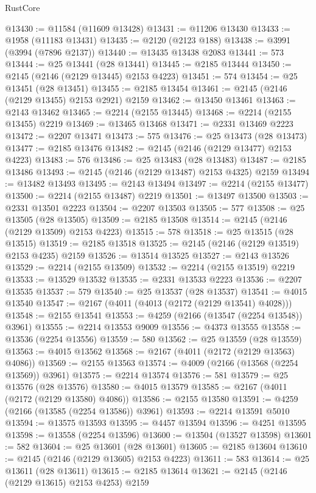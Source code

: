 \begin{lexlean}{RustCore}
\begin{coremodule}
@13430 := @11584 (@11609 @13428)
@13431 := @11206 @13430
@13433 := @1958 (@11183 @13431)
@13435 := @2120 (@2123 @188)
@13438 := @3991 (@3994 (@7896 @2137))
@13440 := @13435 @13438 @2083
@13441 := 573
@13444 := @25 @13441 (@28 @13441)
@13445 := @2185 @13444
@13450 := @2145 (@2146 (@2129 @13445) @2153 @4223)
@13451 := 574
@13454 := @25 @13451 (@28 @13451)
@13455 := @2185 @13454
@13461 := @2145 (@2146 (@2129 @13455) @2153 @2921) @2159
@13462 := @13450 @13461
@13463 := @2143 @13462
@13465 := @2214 (@2155 @13445)
@13468 := @2214 (@2155 @13455) @2219
@13469 := @13465 @13468
@13471 := @2331 @13469 @2223
@13472 := @2207 @13471
@13473 := 575
@13476 := @25 @13473 (@28 @13473)
@13477 := @2185 @13476
@13482 := @2145 (@2146 (@2129 @13477) @2153 @4223)
@13483 := 576
@13486 := @25 @13483 (@28 @13483)
@13487 := @2185 @13486
@13493 := @2145 (@2146 (@2129 @13487) @2153 @4325) @2159
@13494 := @13482 @13493
@13495 := @2143 @13494
@13497 := @2214 (@2155 @13477)
@13500 := @2214 (@2155 @13487) @2219
@13501 := @13497 @13500
@13503 := @2331 @13501 @2223
@13504 := @2207 @13503
@13505 := 577
@13508 := @25 @13505 (@28 @13505)
@13509 := @2185 @13508
@13514 := @2145 (@2146 (@2129 @13509) @2153 @4223)
@13515 := 578
@13518 := @25 @13515 (@28 @13515)
@13519 := @2185 @13518
@13525 := @2145 (@2146 (@2129 @13519) @2153 @4235) @2159
@13526 := @13514 @13525
@13527 := @2143 @13526
@13529 := @2214 (@2155 @13509)
@13532 := @2214 (@2155 @13519) @2219
@13533 := @13529 @13532
@13535 := @2331 @13533 @2223
@13536 := @2207 @13535
@13537 := 579
@13540 := @25 @13537 (@28 @13537)
@13541 := @4015 @13540
@13547 := @2167 (@4011 (@4013 (@2172 (@2129 @13541) @4028)))
@13548 := @2155 @13541
@13553 := @4259 (@2166 (@13547 (@2254 @13548)) @3961)
@13555 := @2214 @13553 @9009
@13556 := @4373 @13555
@13558 := @13536 (@2254 @13556)
@13559 := 580
@13562 := @25 @13559 (@28 @13559)
@13563 := @4015 @13562
@13568 := @2167 (@4011 (@2172 (@2129 @13563) @4086))
@13569 := @2155 @13563
@13574 := @4009 (@2166 (@13568 (@2254 @13569)) @3961)
@13575 := @2214 @13574
@13576 := 581
@13579 := @25 @13576 (@28 @13576)
@13580 := @4015 @13579
@13585 := @2167 (@4011 (@2172 (@2129 @13580) @4086))
@13586 := @2155 @13580
@13591 := @4259 (@2166 (@13585 (@2254 @13586)) @3961)
@13593 := @2214 @13591 @5010
@13594 := @13575 @13593
@13595 := @4457 @13594
@13596 := @4251 @13595
@13598 := @13558 (@2254 @13596)
@13600 := @13504 (@13527 @13598)
@13601 := 582
@13604 := @25 @13601 (@28 @13601)
@13605 := @2185 @13604
@13610 := @2145 (@2146 (@2129 @13605) @2153 @4223)
@13611 := 583
@13614 := @25 @13611 (@28 @13611)
@13615 := @2185 @13614
@13621 := @2145 (@2146 (@2129 @13615) @2153 @4253) @2159

\end{coremodule}
\end{lexlean}
